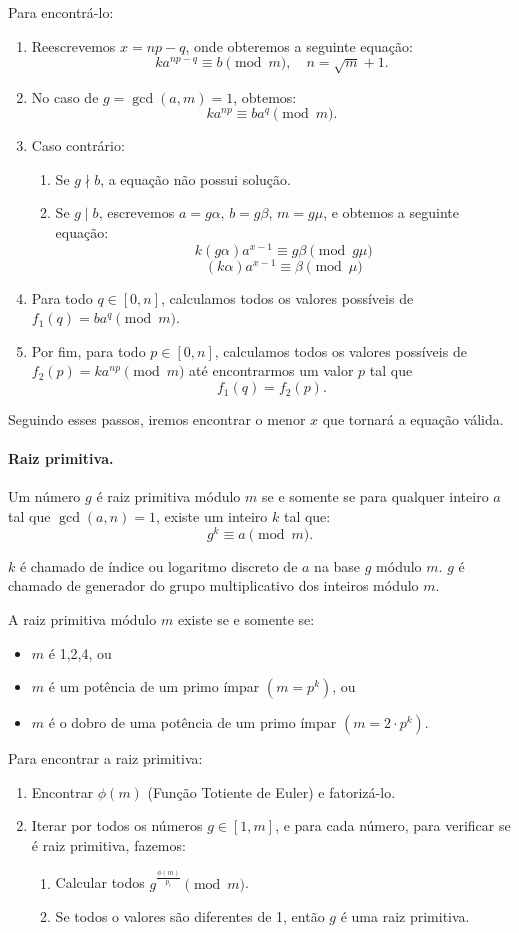 Para encontrá-lo:
\begin{enumerate}
    \item Reescrevemos $x=np-q$, onde obteremos a seguinte equação:
    $$ka^{np-q} \equiv b \pmod{m}, \quad n = \sqrt{m}+1.$$
    \item No caso de $g = \gcd(a,m) = 1$, obtemos:
    $$ka^{np} \equiv ba^q \pmod{m}.$$
    \item Caso contrário:
    \begin{enumerate}
        \item Se $g \nmid b$, a equação não possui solução.
        \item Se $g \mid b$, escrevemos $a=g\alpha$, $b=g\beta$, $m=g\mu$, e obtemos a seguinte equação:
        $$k(g\alpha)a^{x-1} \equiv g\beta \pmod{g\mu}$$
        $$(k\alpha)a^{x-1} \equiv \beta \pmod{\mu}$$
    \end{enumerate}
    \item Para todo $q \in [0,n]$, calculamos todos os valores possíveis de $f_1(q) = ba^q \pmod{m}$.
    \item Por fim, para todo $p \in [0,n]$, calculamos todos os valores possíveis de $f_2(p) = ka^{np} \pmod{m}$ até encontrarmos um valor $p$ tal que
    $$f_1(q) = f_2(p).$$
\end{enumerate}

Seguindo esses passos, iremos encontrar o menor $x$ que tornará a equação válida.

\paragraph{Raiz primitiva.} Um número $g$ é raiz primitiva módulo $m$ se e somente se para qualquer inteiro $a$ tal que $\gcd(a,n) = 1$, existe um inteiro $k$ tal que:
$$g^k \equiv a \pmod m.$$

$k$ é chamado de índice ou logaritmo discreto de $a$ na base $g$ módulo $m$. $g$ é chamado de generador do grupo multiplicativo dos inteiros módulo $m$.

A raiz primitiva módulo $m$ existe se e somente se:
\begin{itemize}
    \item $m$ é 1,2,4, ou
    \item $m$ é um potência de um primo ímpar $(m = p^k)$, ou
    \item $m$ é o dobro de uma potência de um primo ímpar $(m = 2\cdot p^k)$.
\end{itemize}

Para encontrar a raiz primitiva:
\begin{enumerate}
    \item Encontrar $\phi(m)$ (Função Totiente de Euler) e fatorizá-lo.
    \item Iterar por todos os números $g \in [1,m]$, e para cada número, para verificar se é raiz primitiva, fazemos:
    \begin{enumerate}
        \item Calcular todos $g^{\frac{\phi(m)}{p_i}} \pmod m$.
        \item Se todos o valores são diferentes de 1, então $g$ é uma raiz primitiva.
    \end{enumerate} 
\end{enumerate}
